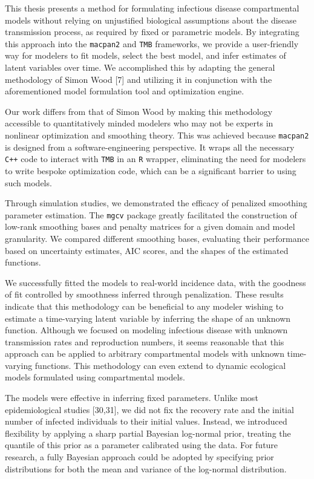 \documentclass[
11pt, %
oneside, %
english, %
singlespacing, %
]{macthesis} %
\begin{document}
This thesis presents a method for formulating infectious disease compartmental models without relying on unjustified biological assumptions about the disease transmission process, as required by fixed or parametric models. By integrating this approach into the \texttt{macpan2} and \texttt{TMB} frameworks, we provide a user-friendly way for modelers to fit models, select the best model, and infer estimates of latent variables over time. We accomplished this by adapting the general methodology of Simon Wood {[}7{]} and utilizing it in conjunction with the aforementioned model formulation tool and optimization engine.

Our work differs from that of Simon Wood by making this methodology accessible to quantitatively minded modelers who may not be experts in nonlinear optimization and smoothing theory. This was achieved because \texttt{macpan2} is designed from a software-engineering perspective. It wraps all the necessary \texttt{C++} code to interact with \texttt{TMB} in an \texttt{R} wrapper, eliminating the need for modelers to write bespoke optimization code, which can be a significant barrier to using such models.

Through simulation studies, we demonstrated the efficacy of penalized smoothing parameter estimation. The \texttt{mgcv} package greatly facilitated the construction of low-rank smoothing bases and penalty matrices for a given domain and model granularity. We compared different smoothing bases, evaluating their performance based on uncertainty estimates, AIC scores, and the shapes of the estimated functions.

We successfully fitted the models to real-world incidence data, with the goodness of fit controlled by smoothness inferred through penalization. These results indicate that this methodology can be beneficial to any modeler wishing to estimate a time-varying latent variable by inferring the shape of an unknown function. Although we focused on modeling infectious disease with unknown transmission rates and reproduction numbers, it seems reasonable that this approach can be applied to arbitrary compartmental models with unknown time-varying functions. This methodology can even extend to dynamic ecological models formulated using compartmental models.

The models were effective in inferring fixed parameters. Unlike most epidemiological studies {[}30,31{]}, we did not fix the recovery rate and the initial number of infected individuals to their initial values. Instead, we introduced flexibility by applying a sharp partial Bayesian log-normal prior, treating the quantile of this prior as a parameter calibrated using the data. For future research, a fully Bayesian approach could be adopted by specifying prior distributions for both the mean and variance of the log-normal distribution.
\end{document}
